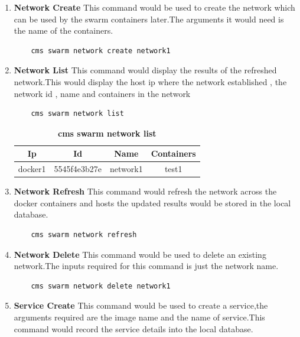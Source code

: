 \documentclass[9pt,twocolumn,twoside]{../../styles/osajnl}
\begin{document}
\begin{enumerate}
    
    \item \textbf{Network Create}
    This command would be used to create the network which can be used by the swarm containers later.The arguments it would need is the name of the containers.
    
    \begin{verbatim}
    cms swarm network create network1 
    \end{verbatim}
    
    \item \textbf{Network List}
     This command would display the results of the refreshed network.This would display the host ip where the network established , the network id , name and containers in the network\\
     
    \begin{verbatim}
    cms swarm network list  
    \end{verbatim}
    
    \begin{table}[htbp]
     \caption{\bf cms swarm network list }
     \begin{tabular}{cccc}
     \hline
      Ip & Id & Name & Containers\\
      \hline
      docker1 & 5545f4e3b27e & network1 & test1  \\
     \hline
     \end{tabular}
     \label{tab:shape-functions}
     \end{table}
     
    \item \textbf{Network Refresh}
    This command would refresh the network across the docker containers and hosts the updated results would be stored in the local database.\\
    
    \begin{verbatim}
    cms swarm network refresh  
    \end{verbatim}
    
    
    \item \textbf{Network Delete}
    This command would be used to delete an existing network.The inputs required for this command is just the network name.
    
    \begin{verbatim}
    cms swarm network delete network1  
    \end{verbatim}
    
    
    \item \textbf{Service Create}
    This command would be used to create a service,the arguments required are the image name and the name of service.This command would record the service details into the local database.\\
    

\end{enumerate}
\end{document}
